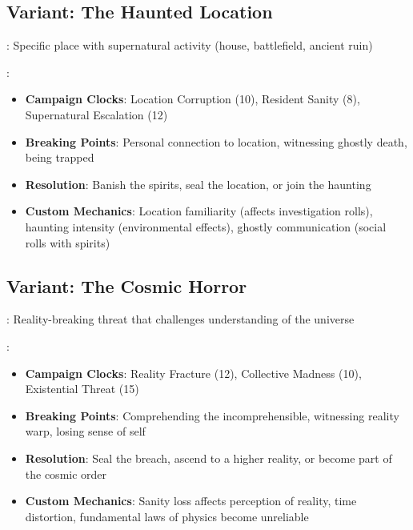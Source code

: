 \documentclass[11pt]{article}
\begin{document}
\subsection*{Variant: The Haunted Location}

\begin{description}[leftmargin=*]
\item[Setting]: Specific place with supernatural activity (house, battlefield, ancient ruin)
\item[Key Elements]:
\begin{itemize}[leftmargin=*]
\item \textbf{Campaign Clocks}: Location Corruption (10), Resident Sanity (8), Supernatural Escalation (12)
\item \textbf{Breaking Points}: Personal connection to location, witnessing ghostly death, being trapped
\item \textbf{Resolution}: Banish the spirits, seal the location, or join the haunting
\item \textbf{Custom Mechanics}: Location familiarity (affects investigation rolls), haunting intensity (environmental effects), ghostly communication (social rolls with spirits)
\end{itemize}
\end{description}

\subsection*{Variant: The Cosmic Horror}

\begin{description}[leftmargin=*]
\item[Setting]: Reality-breaking threat that challenges understanding of the universe
\item[Key Elements]:
\begin{itemize}[leftmargin=*]
\item \textbf{Campaign Clocks}: Reality Fracture (12), Collective Madness (10), Existential Threat (15)
\item \textbf{Breaking Points}: Comprehending the incomprehensible, witnessing reality warp, losing sense of self
\item \textbf{Resolution}: Seal the breach, ascend to a higher reality, or become part of the cosmic order
\item \textbf{Custom Mechanics}: Sanity loss affects perception of reality, time distortion, fundamental laws of physics become unreliable
\end{itemize}
\end{description}
\end{document}
